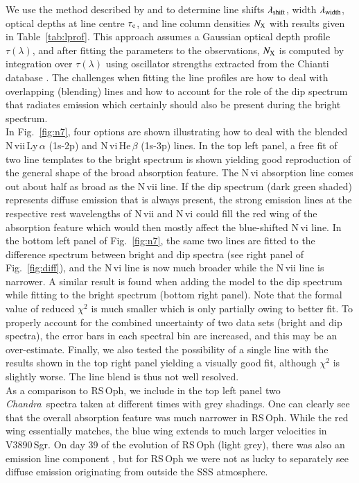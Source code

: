 \documentclass{aa}
\newcommand{\chandra}{{\it Chandra}}
\begin{document}
We use the method described by \cite{ness09} and \cite{nessv2491} to determine
line shifts $\lambda_{\rm shift}$, width $\lambda_{\rm width}$, optical depths at line centre $\tau_{\rm c}$, and line column densities $N_{\rm X}$
with results given in Table~\ref{tab:lprof}. This approach assumes a Gaussian
optical depth profile $\tau(\lambda)$, and after fitting the parameters
to the observations, $N_{\rm X}$ is computed by integration over
$\tau(\lambda)$ using oscillator strengths extracted from the Chianti database
\citep{chianti}. The challenges when fitting
the line profiles are how to deal with overlapping (blending) lines and
how to account for the role of the dip spectrum that radiates emission
which certainly should also be present during the bright spectrum.\\

In Fig.~\ref{fig:n7}, four options are shown illustrating how to
deal with the blended
N\,{\sc vii}\,Ly\,$\alpha$ (1s-2p) and N\,{\sc vi}\,He\,$\beta$ (1s-3p)
lines. In the top left panel, a free fit of two line templates to the bright
spectrum is shown yielding good reproduction of the general shape of the
broad absorption feature. The N\,{\sc vi} absorption line comes out
about half as broad as the N\,{\sc vii} line. If the dip spectrum
(dark green shaded) represents diffuse emission that is always present,
the strong emission lines at
the respective rest wavelengths of N\,{\sc vii} and N\,{\sc vi} could
fill the red wing of the absorption feature which
would then mostly affect the blue-shifted N\,{\sc vi} line.
In the bottom left panel of Fig.~\ref{fig:n7}, the same two lines are
fitted to the difference spectrum between bright and dip spectra
(see right panel of Fig.~\ref{fig:diff}), and the N\,{\sc vi} line
is now much broader while the N\,{\sc vii} line is narrower. A similar
result is found when adding the model to the dip spectrum while fitting
to the bright spectrum (bottom right panel). Note that the formal value
of reduced $\chi^2$ is much smaller which is only partially owing to better
fit. To properly account for the combined uncertainty of two data sets
(bright and dip spectra), the error bars in each spectral bin are
increased, and this may be an over-estimate.
Finally, we also tested the possibility of a single line with the results
shown in the top right panel yielding a visually good fit, although
$\chi^2$ is slightly worse. The line blend is thus not well resolved.\\

As a comparison to RS\,Oph, we include in the top left panel
two \chandra\ spectra taken at different times with grey shadings.
One can clearly see that the overall absorption feature was
much narrower in RS\,Oph. While the red wing essentially
matches, the blue wing extends to much larger velocities
in V3890\,Sgr. On day 39 of the evolution of RS\,Oph (light grey),
there was also an emission line component \citep{nessrsoph},
but for RS\,Oph we were not as lucky to separately see diffuse
emission originating from outside the SSS atmosphere.\\
\end{document}
